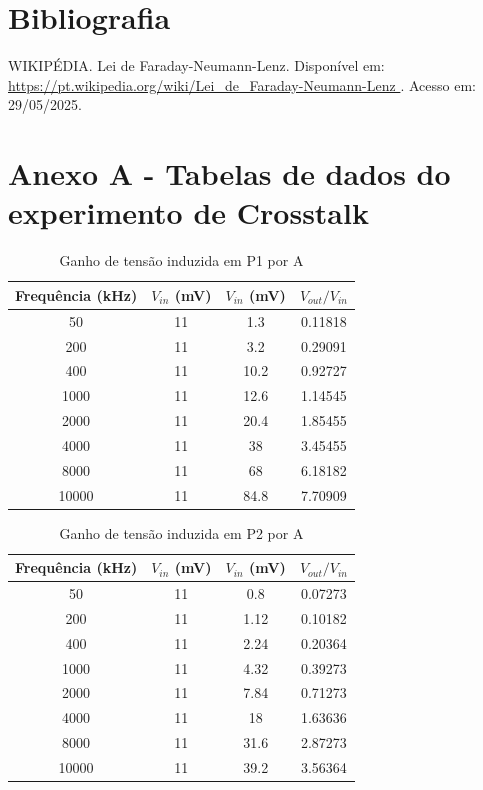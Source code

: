 \documentclass[12pt]{article}
\begin{document}
\section{Bibliografia}
WIKIPÉDIA. Lei de Faraday-Neumann-Lenz. Disponível em:
\url{https://pt.wikipedia.org/wiki/Lei_de_Faraday-Neumann-Lenz } .
Acesso em: 29/05/2025.


\clearpage %
\appendix  %

\section*{Anexo A - Tabelas de dados do experimento de Crosstalk}

\begin{table}[h]
  \centering
  \begin{tabular}{c|c|c|c}
    \toprule
    \textbf{Frequência (kHz)} & \textbf{$V_{in}$ (mV)} &
    \textbf{$V_{in}$ (mV)} & \textbf{${V_{out}}/{V_{in}}$} \\
    \midrule
    50  &11  &1.3  &0.11818 \\
    200  &11  &3.2  &0.29091 \\
    400  &11  &10.2  &0.92727 \\
    1000  &11  &12.6  &1.14545 \\
    2000  &11  &20.4  &1.85455 \\
    4000  &11  &38  &3.45455 \\
    8000  &11  &68  &6.18182 \\
    10000  &11  &84.8  &7.70909 \\
    \bottomrule
  \end{tabular}
  \caption{Ganho de tensão induzida em P1 por A}
  \label{tab:ganho-tensao-p1}
\end{table}

\begin{table}[h]
  \centering
  \begin{tabular}{c|c|c|c}
    \toprule
    \textbf{Frequência (kHz)} & \textbf{$V_{in}$ (mV)} &
    \textbf{$V_{in}$ (mV)} & \textbf{${V_{out}}/{V_{in}}$} \\
    \midrule
    50  &11  &0.8  &0.07273 \\
    200  &11  &1.12  &0.10182 \\
    400  &11  &2.24  &0.20364 \\
    1000  &11  &4.32  &0.39273 \\
    2000  &11  &7.84  &0.71273 \\
    4000  &11  &18  &1.63636 \\
    8000  &11  &31.6  &2.87273 \\
    10000  &11  &39.2  &3.56364 \\
    \bottomrule
  \end{tabular}
  \caption{Ganho de tensão induzida em P2 por A}
  \label{tab:ganho-tensao-p2}
\end{table}
\end{document}
